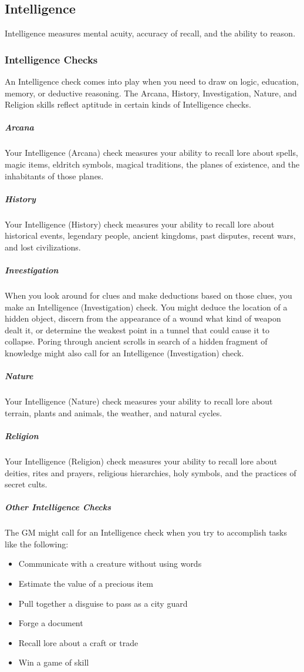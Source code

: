 \subsection{Intelligence}

Intelligence measures mental acuity, accuracy of recall, and the ability to reason.

\subsubsection{Intelligence Checks}

An Intelligence check comes into play when you need to draw on logic, education, memory, or deductive reasoning. The Arcana, History, Investigation, Nature, and Religion skills reflect aptitude in certain kinds of Intelligence checks.

\subparagraph*{Arcana} Your Intelligence (Arcana) check measures your ability to recall lore about spells, magic items, eldritch symbols, magical traditions, the planes of existence, and the inhabitants of those planes.

\subparagraph*{History} Your Intelligence (History) check measures your ability to recall lore about historical events, legendary people, ancient kingdoms, past disputes, recent wars, and lost civilizations.

\subparagraph*{Investigation} When you look around for clues and make deductions based on those clues, you make an Intelligence (Investigation) check. You might deduce the location of a hidden object, discern from the appearance of a wound what kind of weapon dealt it, or determine the weakest point in a tunnel that could cause it to collapse. Poring through ancient scrolls in search of a hidden fragment of knowledge might also call for an Intelligence (Investigation) check.

\subparagraph*{Nature} Your Intelligence (Nature) check measures your ability to recall lore about terrain, plants and animals, the weather, and natural cycles.

\subparagraph*{Religion} Your Intelligence (Religion) check measures your ability to recall lore about deities, rites and prayers, religious hierarchies, holy symbols, and the practices of secret cults.

\subparagraph*{Other Intelligence Checks} The GM might call for an Intelligence check when you try to accomplish tasks like the following:

\begin{itemize}
\item Communicate with a creature without using words
\item Estimate the value of a precious item
\item Pull together a disguise to pass as a city guard
\item Forge a document
\item Recall lore about a craft or trade
\item Win a game of skill
\end{itemize}

